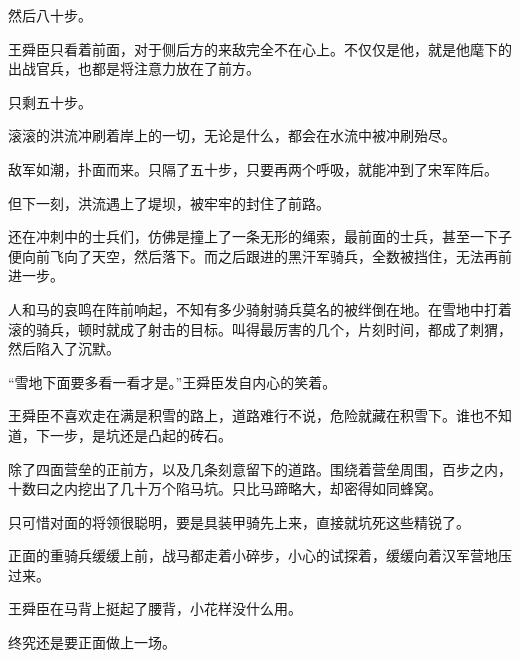 然后八十步。

王舜臣只看着前面，对于侧后方的来敌完全不在心上。不仅仅是他，就是他麾下的出战官兵，也都是将注意力放在了前方。

只剩五十步。

滚滚的洪流冲刷着岸上的一切，无论是什么，都会在水流中被冲刷殆尽。

敌军如潮，扑面而来。只隔了五十步，只要再两个呼吸，就能冲到了宋军阵后。

但下一刻，洪流遇上了堤坝，被牢牢的封住了前路。

还在冲刺中的士兵们，仿佛是撞上了一条无形的绳索，最前面的士兵，甚至一下子便向前飞向了天空，然后落下。而之后跟进的黑汗军骑兵，全数被挡住，无法再前进一步。

人和马的哀鸣在阵前响起，不知有多少骑射骑兵莫名的被绊倒在地。在雪地中打着滚的骑兵，顿时就成了射击的目标。叫得最厉害的几个，片刻时间，都成了刺猬，然后陷入了沉默。

“雪地下面要多看一看才是。”王舜臣发自内心的笑着。

王舜臣不喜欢走在满是积雪的路上，道路难行不说，危险就藏在积雪下。谁也不知道，下一步，是坑还是凸起的砖石。

除了四面营垒的正前方，以及几条刻意留下的道路。围绕着营垒周围，百步之内，十数曰之内挖出了几十万个陷马坑。只比马蹄略大，却密得如同蜂窝。

只可惜对面的将领很聪明，要是具装甲骑先上来，直接就坑死这些精锐了。

正面的重骑兵缓缓上前，战马都走着小碎步，小心的试探着，缓缓向着汉军营地压过来。

王舜臣在马背上挺起了腰背，小花样没什么用。

终究还是要正面做上一场。

